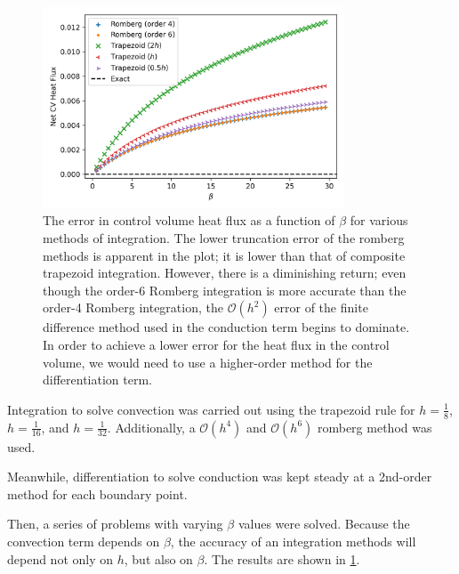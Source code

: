 \documentclass[10pt,letterpaper,notitlepage]{article}
\begin{document}
    \begin{figure}
        \centering
        \includegraphics[width=0.8\textwidth]{figures/Heat Flux, Step Size, beta.png}
        \caption{The error in control volume heat flux as a function of $\beta$ for various methods of integration. The lower truncation error of the romberg methods is apparent in the plot; it is lower than that of composite trapezoid integration. However, there is a diminishing return; even though the order-6 Romberg integration is more accurate than the order-4 Romberg integration, the $\mathcal{O}(h^2)$ error of the finite difference method used in the conduction term begins to dominate. In order to achieve a lower error for the heat flux in the control volume, we would need to use a higher-order method for the differentiation term.}
        \label{fig:integration5}
    \end{figure}

    Integration to solve convection was carried out using the trapezoid rule for $h=\frac{1}{8}$, $h=\frac{1}{16}$, and $h=\frac{1}{32}$. Additionally, a $\mathcal{O}(h^4)$ and $\mathcal{O}(h^6)$ romberg method was used.

    Meanwhile, differentiation to solve conduction was kept steady at a 2nd-order method for each boundary point.

    Then, a series of problems with varying $\beta$ values were solved. Because the convection term depends on $\beta$, the accuracy of an integration methods will depend not only on $h$, but also on $\beta$. The results are shown in \cref{fig:integration5}.
\end{document}
